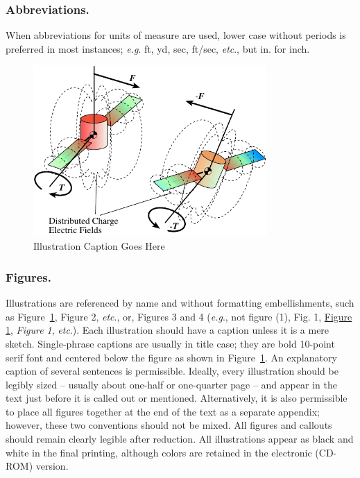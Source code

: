 \documentclass[letterpaper, preprint, paper,11pt]{AAS}	%
\begin{document}
\subsubsection{Abbreviations.} 
When abbreviations for units of measure are used, lower case without periods is preferred in most instances; \emph{e.g}. ft, yd, sec, ft/sec, \emph{etc}., but in. for inch.




\begin{figure}[htb]
	\centering\includegraphics[width=3.5in]{Figures/test}
	\caption{Illustration Caption Goes Here}
	\label{fig:xxx}
\end{figure}

\subsubsection{Figures.}   
Illustrations are referenced by name and without formatting embellishments, such as Figure~\ref{fig:xxx}, Figure 2, \emph{etc}., or, Figures 3 and 4 (\emph{e.g}., not figure (1), Fig. 1, \underline{Figure 1}, \emph{Figure 1}, \emph{etc}.). Each illustration should have a caption unless it is a mere sketch. Single-phrase captions are usually in title case; they are bold 10-point serif font and centered below the figure as shown in Figure~\ref{fig:xxx}. An explanatory caption of several sentences is permissible. Ideally, every illustration should be legibly sized -- usually about one-half or one-quarter page -- and appear in the text just before it is called out or mentioned. Alternatively, it is also permissible to place all figures together at the end of the text as a separate appendix; however, these two conventions should not be mixed. All figures and callouts should remain clearly legible after reduction. All illustrations appear as black and white in the final printing, although colors are retained in the electronic (CD-ROM) version.
\end{document}
